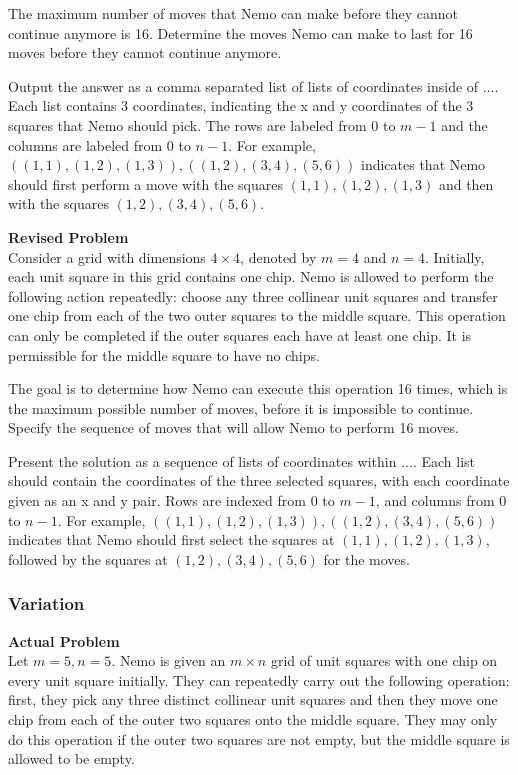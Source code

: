 The maximum number of moves that Nemo can make before they cannot continue anymore is 16. Determine the moves Nemo can make to last for 16 moves before they cannot continue anymore.

Output the answer as a comma separated list of lists of coordinates inside of $\boxed{...}$. Each list contains 3 coordinates, indicating the x and y coordinates of the 3 squares that Nemo should pick. The rows are labeled from $0$ to $m-1$ and the columns are labeled from $0$ to $n-1$. For example, $\boxed{((1,1),(1,2),(1,3)),((1,2),(3,4),(5,6))}$ indicates that Nemo should first perform a move with the squares $(1,1), (1,2), (1,3)$ and then with the squares $(1,2),(3,4),(5,6)$.

\textbf{Revised Problem}\\
Consider a grid with dimensions $4 \times 4$, denoted by $m = 4$ and $n = 4$. Initially, each unit square in this grid contains one chip. Nemo is allowed to perform the following action repeatedly: choose any three collinear unit squares and transfer one chip from each of the two outer squares to the middle square. This operation can only be completed if the outer squares each have at least one chip. It is permissible for the middle square to have no chips. 

The goal is to determine how Nemo can execute this operation 16 times, which is the maximum possible number of moves, before it is impossible to continue. Specify the sequence of moves that will allow Nemo to perform 16 moves.

Present the solution as a sequence of lists of coordinates within $\boxed{...}$. Each list should contain the coordinates of the three selected squares, with each coordinate given as an x and y pair. Rows are indexed from $0$ to $m-1$, and columns from $0$ to $n-1$. For example, $\boxed{((1,1),(1,2),(1,3)),((1,2),(3,4),(5,6))}$ indicates that Nemo should first select the squares at $(1,1), (1,2), (1,3)$, followed by the squares at $(1,2),(3,4),(5,6)$ for the moves.

\subsubsection{Variation}
\textbf{Actual Problem}\\
Let $m = 5, n = 5$. Nemo is given an $m \times n$ grid of unit squares with one chip on every unit square initially. They can repeatedly carry out the following operation: first, they pick any three distinct collinear unit squares and then they move one chip from each of the outer two squares onto the middle square. They may only do this operation if the outer two squares are not empty, but the middle square is allowed to be empty. 

